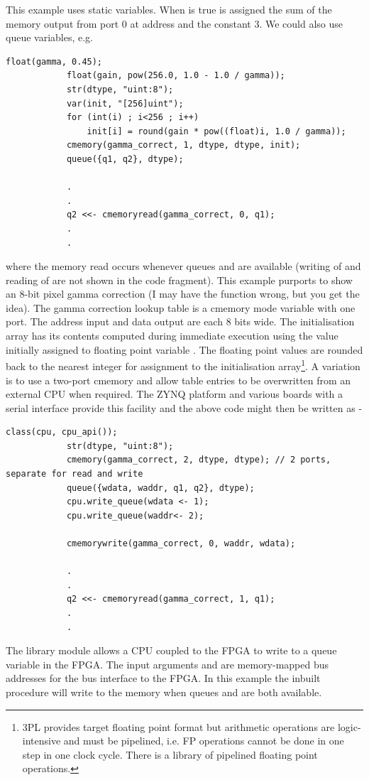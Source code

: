         This example uses static variables. When  is true  is
        assigned the sum of the memory output from port 0 at address  and
        the constant 3. We could also use queue variables, e.g.
        \pagebreak
        \begin{lstlisting}[language=threepl]
            float(gamma, 0.45);
            float(gain, pow(256.0, 1.0 - 1.0 / gamma));
            str(dtype, "uint:8");
            var(init, "[256]uint");
            for (int(i) ; i<256 ; i++)
                init[i] = round(gain * pow((float)i, 1.0 / gamma));
            cmemory(gamma_correct, 1, dtype, dtype, init);
            queue({q1, q2}, dtype);

            .
            .
            q2 <<- cmemoryread(gamma_correct, 0, q1);
            .
            .
        \end{lstlisting}
        where the memory read occurs whenever queues  and  are
        available (writing of  and reading of  are not shown in
        the code fragment). This example purports to show an 8-bit pixel gamma
        correction (I may have the function wrong, but you get the idea). The
        gamma correction lookup table is a cmemory mode variable with one port.
        The address input and data output are each 8 bits wide. The initialisation
        array has its contents computed during immediate execution using the
        value initially assigned to floating point variable . The
        floating point values are rounded back to the nearest integer for
        assignment to the initialisation array\footnote{3PL provides
        target floating point format but arithmetic operations are logic-intensive and
        must be pipelined, i.e. FP operations cannot be done in one step in one
        clock cycle. There is a library of pipelined floating point operations.}.
        A variation is to use a two-port cmemory and allow table entries to be
        overwritten from an external CPU when required. The ZYNQ platform and
        various boards with a serial interface provide this facility and the
        above code might then be written as -
        \begin{lstlisting}[language=threepl]
            class(cpu, cpu_api());
            str(dtype, "uint:8");
            cmemory(gamma_correct, 2, dtype, dtype); // 2 ports, separate for read and write
            queue({wdata, waddr, q1, q2}, dtype);
            cpu.write_queue(wdata <- 1);
            cpu.write_queue(waddr<- 2);

            cmemorywrite(gamma_correct, 0, waddr, wdata);

            .
            .
            q2 <<- cmemoryread(gamma_correct, 1, q1);
            .
            .
        \end{lstlisting}
        The library module  allows a CPU coupled to the FPGA
        to write to a queue variable in the FPGA. The input arguments  and
         are memory-mapped bus addresses for the bus interface to the FPGA.
        In this example the  inbuilt procedure will write to the
        memory when queues  and  are both available.

